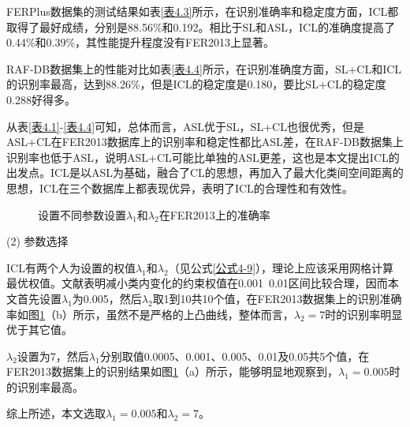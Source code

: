 FERPlus数据集的测试结果如表\ref{表4.3}所示，在识别准确率和稳定度方面，ICL都取得了最好成绩，分别是88.56\%和0.192。相比于SL和ASL，ICL的准确度提高了0.44\%和0.39\%，其性能提升程度没有FER2013上显著。

RAF-DB数据集上的性能对比如表\ref{表4.4}所示，在识别准确度方面，SL+CL和ICL的识别率最高，达到88.26\%，但是ICL的稳定度是0.180，要比SL+CL的稳定度0.288好得多。


从表\ref{表4.1}-\ref{表4.4}可知，总体而言，ASL优于SL，SL+CL也很优秀，但是ASL+CL在FER2013数据库上的识别率和稳定性都比ASL差，在RAF-DB数据集上识别率也低于ASL，说明ASL+CL可能比单独的ASL更差，这也是本文提出ICL的出发点。ICL是以ASL为基础，融合了CL的思想，再加入了最大化类间空间距离的思想，ICL在三个数据库上都表现优异，表明了ICL的合理性和有效性。

\begin{figure}[!ht]
	\centering
	\hfil
	\caption{设置不同参数设置$\lambda_1$和$\lambda_2$在FER2013上的准确率}
	\label{图4.2}
\end{figure}

(2)	参数选择

ICL有两个人为设置的权值$\lambda_1$和$\lambda_2$（见公式\ref{公式4-9}），理论上应该采用网格计算最优权值。文献\cite{63,64,69,61}表明减小类内变化的约束权值在0.001~0.01区间比较合理，因而本文首先设置$\lambda_1$为0.005，然后$\lambda_2$取1到10共10个值，在FER2013数据集上的识别准确率如图\ref{图4.2}（b）所示，虽然不是严格的上凸曲线，整体而言，$\lambda_2=7$时的识别率明显优于其它值。

$\lambda_2$设置为7，然后$\lambda_1$分别取值0.0005、0.001、0.005、0.01及0.05共5个值，在FER2013数据集上的识别结果如图\ref{图4.2}（a）所示，能够明显地观察到，$\lambda_1=0.005$时的识别率最高。

综上所述，本文选取$\lambda_1=0.005$和$\lambda_2=7$。


